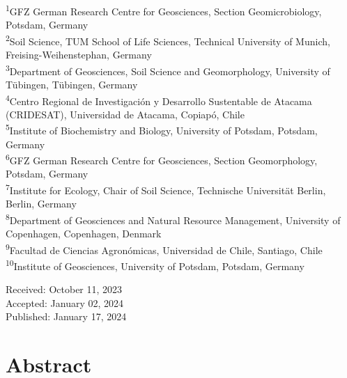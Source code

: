 \begin{scriptsize}
  \begin{justify}
      \textsuperscript{1}GFZ German Research Centre for Geosciences, Section Geomicrobiology, Potsdam, Germany\\
      \textsuperscript{2}Soil Science, TUM School of Life Sciences, Technical University of Munich, Freising-Weihenstephan, Germany\\
      \textsuperscript{3}Department of Geosciences, Soil Science and Geomorphology, University of T{\"u}bingen, T{\"u}bingen, Germany\\
      \textsuperscript{4}Centro Regional de Investigaci{\'o}n y Desarrollo Sustentable de Atacama (CRIDESAT), Universidad de Atacama, Copiap{\'o}, Chile\\
      \textsuperscript{5}Institute of Biochemistry and Biology, University of Potsdam, Potsdam, Germany\\
      \textsuperscript{6}GFZ German Research Centre for Geosciences, Section Geomorphology, Potsdam, Germany\\
      \textsuperscript{7}Institute for Ecology, Chair of Soil Science, Technische Universit{\"a}t Berlin, Berlin, Germany\\
      \textsuperscript{8}Department of Geosciences and Natural Resource Management, University of Copenhagen, Copenhagen, Denmark\\
      \textsuperscript{9}Facultad de Ciencias Agron{\'o}micas, Universidad de Chile, Santiago, Chile\\
      \textsuperscript{10}Institute of Geosciences, University of Potsdam, Potsdam, Germany
  \end{justify}
\end{scriptsize}

\vspace{0.4cm}
  
\begin{flushleft}
    Received: October 11, 2023\\
    Accepted: January 02, 2024\\
    Published: January 17, 2024
\end{flushleft}
  
\cleardoublepage
  
\section*{Abstract} %

